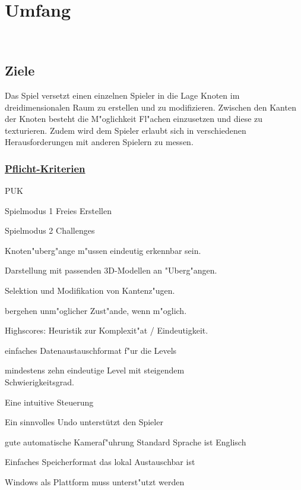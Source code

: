 %
%


\chapter{Umfang}
\label{UF}~\\


%
%
\section{Ziele}
\label{UF:Ziele}

Das Spiel versetzt einen einzelnen Spieler in die Lage Knoten im dreidimensionalen Raum zu erstellen und zu modifizieren. Zwischen den Kanten der Knoten besteht die M{"o}glichkeit Fl{"a}chen einzusetzen und diese zu texturieren. Zudem wird dem Spieler erlaubt sich in verschiedenen Herausforderungen mit anderen Spielern zu messen.\\

% 
%
\subsection*{\underline{Pflicht-Kriterien}}

\begin{ids}{\gls{PUK}}


		\id[10] Spielmodus 1 Freies Erstellen
		
		\id[20] Spielmodus 2 Challenges
		
		\id[30] Knoten{"u}berg{"a}nge m{"u}ssen eindeutig erkennbar sein.
		
		\id[40] Darstellung mit passenden 3D-Modellen an {"U}berg{"a}ngen.
		
		\id[50] Selektion und Modifikation von Kantenz{"u}gen.
		
		bergehen unm{"o}glicher Zust{"a}nde, wenn m{"o}glich.
		
		\id[70] Highscores: Heuristik zur Komplexit{"a}t / Eindeutigkeit.
		
		\id[80] einfaches Datenaustauschformat f{"u}r die Levels
		
		\id[80] mindestens zehn eindeutige Level mit steigendem \\Schwierigkeitsgrad.
		
		\id[90] Eine intuitive Steuerung 
		
		\id[100] Ein sinnvolles Undo unterstützt den Spieler
		
		\id[110] gute automatische Kameraf{"u}hrung
		\id[120] Standard Sprache ist Englisch
		
	
		\id[130]  Einfaches Speicherformat das lokal Austauschbar ist
		
		\id[140] Windows als Plattform muss unterst{"u}tzt werden

\end{ids}

